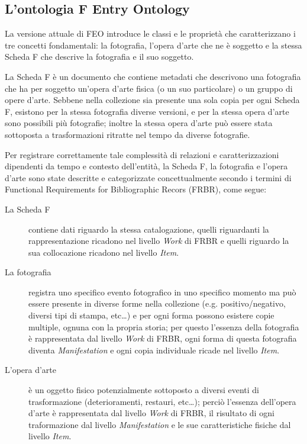 \subsection{L'ontologia F Entry Ontology}\label{sec:feo}
La versione attuale di FEO introduce le classi e le proprietà che caratterizzano i tre concetti fondamentali: la fotografia, l'opera d'arte che ne è soggetto e la stessa Scheda F che descrive la fotografia e il suo soggetto.

La Scheda F è un documento che contiene metadati che descrivono una fotografia che ha per soggetto un'opera d'arte fisica (o un suo particolare) o un gruppo di opere d'arte. Sebbene nella collezione sia presente una sola copia per ogni Scheda F, esistono per la stessa fotografia diverse versioni, e per la stessa opera d'arte sono possibili più fotografie; inoltre la stessa opera d'arte può essere stata sottoposta a trasformazioni ritratte nel tempo da diverse fotografie.

Per registrare correttamente tale complessità di relazioni e caratterizzazioni dipendenti da tempo e contesto dell'entità, la Scheda F, la fotografia e l'opera d'arte sono state descritte e categorizzate concettualmente secondo i termini di Functional Requirements for Bibliographic Recors (FRBR), come segue:
\begin{description}
\item[La Scheda F] contiene dati riguardo la stessa catalogazione, quelli riguardanti la rappresentazione ricadono nel livello \emph{Work} di FRBR e quelli riguardo la sua collocazione ricadono nel livello \emph{Item}.
\item[La fotografia] registra uno specifico evento fotografico in uno specifico momento ma può essere presente in diverse forme nella collezione (e.g. positivo/negativo, diversi tipi di stampa, etc\ldots) e per ogni forma possono esistere copie multiple, ognuna con la propria storia; per questo l'essenza della fotografia è rappresentata dal livello \emph{Work} di FRBR, ogni forma di questa fotografia diventa \emph{Manifestation} e ogni copia individuale ricade nel livello \emph{Item}.
\item[L'opera d'arte] è un oggetto fisico potenzialmente sottoposto a diversi eventi di trasformazione (deterioramenti, restauri, etc\ldots); perciò l'essenza dell'opera d'arte è rappresentata dal livello \emph{Work} di FRBR, il risultato di ogni traformazione dal livello \emph{Manifestation} e le sue caratteristiche fisiche dal livello \emph{Item}.
\end{description}

